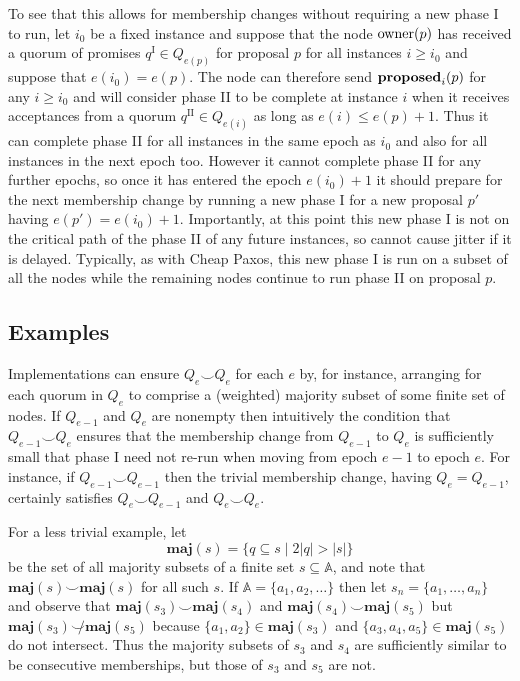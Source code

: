 \documentclass[journal]{IEEEtran}
\begin{document}
To see that this allows for membership changes without requiring a new phase I
to run, let $i_0$ be a fixed instance and suppose that the node $\mathrm{owner}(p)$ has
received a quorum of promises $q^\textrm{I} \in Q_{e(p)}$ for proposal $p$ for
all instances $i \ge i_0$ and suppose that $e(i_0) = e(p)$. The node can
therefore send $\mathbf{proposed}_{i}(p)$ for any $i \ge i_0$ and will consider phase II to
be complete at instance $i$ when it receives acceptances from a quorum
$q^\textrm{II} \in Q_{e(i)}$ as long as $e(i) \le e(p) + 1$. Thus it can
complete phase II for all instances in the same epoch as $i_0$ and also for all
instances in the next epoch too.  However it cannot complete phase II for any
further epochs, so once it has entered the epoch $e(i_0) + 1$ it should prepare
for the next membership change by running a new phase I for a new proposal $p'$
having $e(p') = e(i_0) + 1$. Importantly, at this point this new phase I is not
on the critical path of the phase II of any future instances, so cannot cause
jitter if it is delayed. Typically, as with Cheap Paxos, this new phase I is
run on a subset of all the nodes while the remaining nodes continue to run
phase II on proposal $p$.

\subsection{Examples}\label{types-of-membership-change}

\def\maj#1{\mathbf{maj}(#1)}

Implementations can ensure $Q_e \smile Q_e$ for each $e$ by, for instance,
arranging for each quorum in $Q_e$ to comprise a (weighted) majority subset of
some finite set of nodes.  If $Q_{e-1}$ and $Q_e$ are nonempty then intuitively
the condition that $Q_{e-1} \smile Q_e$ ensures that the membership change from
$Q_{e-1}$ to $Q_e$ is sufficiently small that phase I need not re-run when
moving from epoch $e-1$ to epoch $e$.  For instance, if $Q_{e-1} \smile
Q_{e-1}$ then the trivial membership change, having $Q_e = Q_{e-1}$, certainly
satisfies $Q_e \smile Q_{e-1}$ and $Q_e \smile Q_e$.

For a less trivial example, let \[\maj{s} = \{ q \subseteq s \mid 2 |q| > |s|
\}\] be the set of all majority subsets of a finite set $s \subseteq \mathbb
A$, and note that $\maj{s} \smile \maj{s}$ for all such $s$.  If $\mathbb A =
\{ a_1, a_2, \ldots \}$ then let $s_n = \{a_1, \ldots, a_n\}$ and observe that
${\maj{s_3} \smile \maj{s_4}}$ and ${\maj{s_4} \smile \maj{s_5}}$ but ${\maj{s_3}
\not\smile \maj{s_5}}$ because $\{a_1, a_2\} \in \maj{s_3}$ and $\{a_3, a_4,
a_5\} \in \maj{s_5}$ do not intersect. Thus the majority subsets of $s_3$ and
$s_4$ are sufficiently similar to be consecutive memberships, but those of
$s_3$ and $s_5$ are not.
\end{document}

